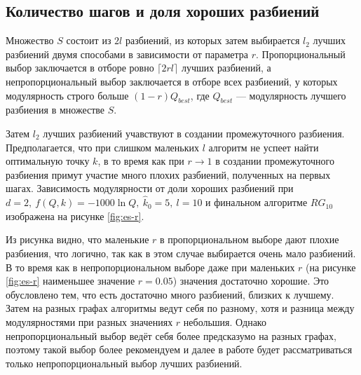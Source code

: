 
\subsection{Количество шагов и доля хороших разбиений}

Множество $S$ состоит из $2l$ разбиений, из которых затем выбирается $l_2$ лучших разбиений двумя способами в зависимости от параметра $r$. Пропорциональный выбор заключается в отборе ровно $\lceil 2rl \rceil$ лучших разбиений, а непропорциональный выбор заключается в отборе всех разбиений, у которых модулярность строго больше $(1 - r) Q_{best}$, где $Q_{best}$ --- модулярность лучшего разбиения в множестве $S$.

Затем $l_2$ лучших разбиений учавствуют в создании промежуточного разбиения. Предполагается, что при слишком маленьких $l$ алгоритм не успеет найти оптимальную точку $k$, в то время как при $r \rightarrow 1$ в создании промежуточного разбиения примут участие много плохих разбиений, полученных на первых шагах. Зависимость модулярности от доли хороших разбиений при $d = 2,\ f(Q, k) = -1000 \ln Q,\ \hat{k}_0 = 5,\ l = 10$ и финальном алгоритме $RG_{10}$ изображена на рисунке \ref{fig:es-r}.

Из рисунка видно, что маленькие $r$ в пропорциональном выборе дают плохие разбиения, что логично, так как в этом случае выбирается очень мало разбиений. В то время как в непропорциональном выборе даже при маленьких $r$ (на рисунке \ref{fig:es-r} наименьшее значение $r = 0.05$) значения достаточно хорошие. Это обусловлено тем, что есть достаточно много разбиений, близких к лучшему. Затем на разных графах алгоритмы ведут себя по разному, хотя и разница между модулярностями при разных значениях $r$ небольшия. Однако непропорциональный выбор ведёт себя более предсказумо на разных графах, поэтому такой выбор более рекомендуем и далее в работе будет рассматриваться только непропорциональный выбор лучших разбиений.

